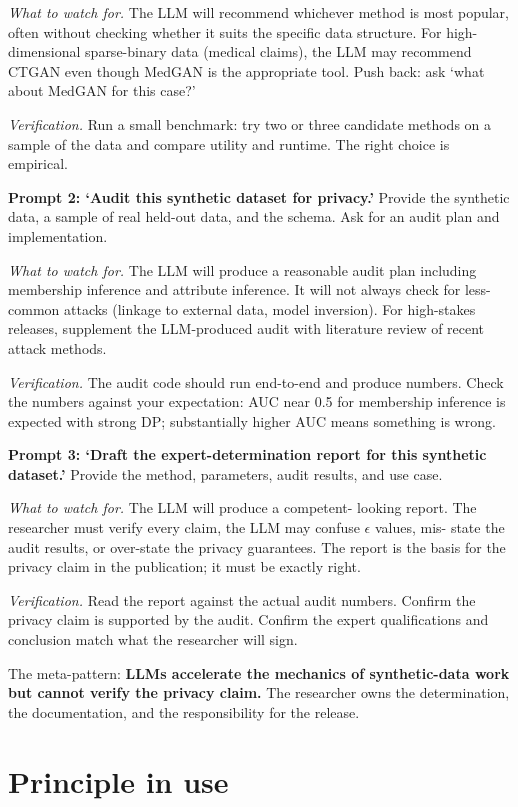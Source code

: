 \documentclass[
  letterpaper,
  11pt]{scrbook}
\begin{document}
\emph{What to watch for.} The LLM will recommend whichever method is
most popular, often without checking whether it suits the specific data
structure. For high- dimensional sparse-binary data (medical claims),
the LLM may recommend CTGAN even though MedGAN is the appropriate tool.
Push back: ask `what about MedGAN for this case?'

\emph{Verification.} Run a small benchmark: try two or three candidate
methods on a sample of the data and compare utility and runtime. The
right choice is empirical.

\textbf{Prompt 2: `Audit this synthetic dataset for privacy.'} Provide
the synthetic data, a sample of real held-out data, and the schema. Ask
for an audit plan and implementation.

\emph{What to watch for.} The LLM will produce a reasonable audit plan
including membership inference and attribute inference. It will not
always check for less-common attacks (linkage to external data, model
inversion). For high-stakes releases, supplement the LLM-produced audit
with literature review of recent attack methods.

\emph{Verification.} The audit code should run end-to-end and produce
numbers. Check the numbers against your expectation: AUC near 0.5 for
membership inference is expected with strong DP; substantially higher
AUC means something is wrong.

\textbf{Prompt 3: `Draft the expert-determination report for this
synthetic dataset.'} Provide the method, parameters, audit results, and
use case.

\emph{What to watch for.} The LLM will produce a competent- looking
report. The researcher must verify every claim, the LLM may confuse
\(\epsilon\) values, mis- state the audit results, or over-state the
privacy guarantees. The report is the basis for the privacy claim in the
publication; it must be exactly right.

\emph{Verification.} Read the report against the actual audit numbers.
Confirm the privacy claim is supported by the audit. Confirm the expert
qualifications and conclusion match what the researcher will sign.

The meta-pattern: \textbf{LLMs accelerate the mechanics of
synthetic-data work but cannot verify the privacy claim.} The researcher
owns the determination, the documentation, and the responsibility for
the release.

\section{Principle in use}\label{principle-in-use-5}
\end{document}
